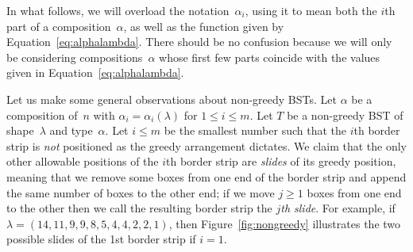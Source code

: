 \documentclass[12pt]{article}
\theoremstyle{definition}
\begin{document}
In what follows, we will overload the notation~$\alpha_i$,
using it to mean both the $i$th part of a composition~$\alpha$,
as well as the function given by Equation~\eqref{eq:alphalambda}.
There should be no confusion because we will only be considering
compositions~$\alpha$ whose first few parts coincide with the
values given in Equation~\eqref{eq:alphalambda}.


Let us make some general observations about non-greedy BSTs.
Let $\alpha$ be a composition of~$n$ with
$\alpha_i = \alpha_i(\lambda)$ for $1\le i \le m$.
Let $T$ be a non-greedy BST of shape~$\lambda$
and type~$\alpha$.
Let $i\le m$ be the smallest number such that
the $i$th border strip is \emph{not} positioned as the
greedy arrangement dictates.
We claim that the only other allowable positions of
the $i$th border strip are \emph{slides} of its greedy position,
meaning that we remove some boxes from one end of the border strip
and append the same number of boxes to the other end;
if we move $j\ge 1$ boxes from one end to the other then
we call the resulting border strip the \emph{$j$th slide}.
For example, if $\lambda=(14,11,9,9,8,5,4,4,2,2,1)$,
then Figure~\ref{fig:nongreedy} illustrates
the two possible slides of the 1st border strip if $i=1$.
\end{document}
